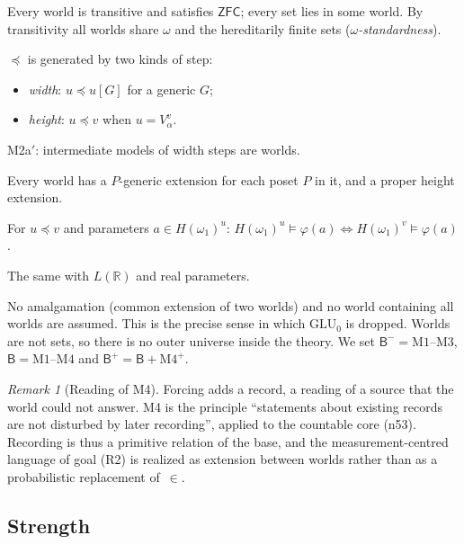 \documentclass[11pt]{article}
\theoremstyle{definition}
\theoremstyle{remark}
\newtheorem{remark}[theorem]{Remark}
\newcommand{\B}{\mathsf{B}}
\newcommand{\Bm}{\mathsf{B}^{-}}
\newcommand{\Bp}{\mathsf{B}^{+}}
\newcommand{\ZFC}{\mathsf{ZFC}}
\newcommand{\GLU}{\mathrm{GLU}}
\newcommand{\Hw}{H(\omega_1)}
\newcommand{\R}{\mathbb{R}}
\newcommand{\note}[1]{\textsf{(n#1)}}
\begin{document}
\begin{description}[leftmargin=2.2em]
\item[M1] Every world is transitive and satisfies $\ZFC$; every set lies in some world. By transitivity all worlds share $\omega$ and the hereditarily finite sets (\emph{$\omega$-standardness}).
\item[M2] $\preccurlyeq$ is generated by two kinds of step:
  \begin{itemize}
  \item \emph{width}: $u\preccurlyeq u[G]$ for a generic $G$;
  \item \emph{height}: $u\preccurlyeq v$ when $u=V^v_\alpha$.
  \end{itemize}
  M2a$'$: intermediate models of width steps are worlds.
\item[M3] Every world has a $P$-generic extension for each poset $P$ in it, and a proper height extension.
\item[M4] For $u\preccurlyeq v$ and parameters $a\in\Hw^u$: $\Hw^u\models\varphi(a)\iff\Hw^v\models\varphi(a)$.
\item[M4$^+$] The same with $L(\R)$ and real parameters.
\end{description}
No amalgamation (common extension of two worlds) and no world containing all worlds are assumed. This is the precise sense in which $\GLU_0$ is dropped. Worlds are not sets, so there is no outer universe inside the theory. We set $\Bm=\text{M1--M3}$, $\B=\text{M1--M4}$ and $\Bp=\B+\text{M4}^+$.

\begin{remark}[Reading of M4]
Forcing adds a record, a reading of a source that the world could not answer. M4 is the principle ``statements about existing records are not disturbed by later recording'', applied to the countable core \note{53}. Recording is thus a primitive relation of the base, and the measurement-centred language of goal (R2) is realized as extension between worlds rather than as a probabilistic replacement of~$\in$.
\end{remark}

\subsection{Strength}
\end{document}
